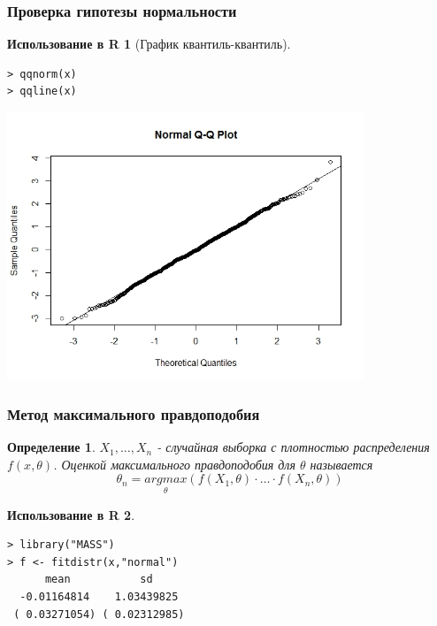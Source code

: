 \documentclass{beamer}
\newtheorem{defn}{Определение}
\newtheorem{exmpr}{Использование в R}
\begin{document}
\begin{frame}[containsverbatim]
\frametitle{Проверка гипотезы нормальности}
\begin{exmpr}[График квантиль-квантиль]
\begin{verbatim}
> qqnorm(x)
> qqline(x)
\end{verbatim}
\begin{center}
\includegraphics[width=0.8\textwidth,height=0.6\textheight]{qqnorm.jpeg}
\end{center}
\end{exmpr}
\end{frame}

\begin{frame}[containsverbatim]
\frametitle{Метод максимального правдоподобия}
\begin{defn}
$X_1,\ldots,X_n$ - случайная выборка с плотностью распределения $f(x,\theta)$. Оценкой максимального правдоподобия для $\theta$ называется 
$$\theta_n=\underset{\theta}{argmax} (f(X_1,\theta)\cdot\ldots\cdot f(X_n,\theta))$$
\end{defn}
\begin{exmpr}
\begin{verbatim}
> library("MASS")
> f <- fitdistr(x,"normal")
      mean           sd     
  -0.01164814    1.03439825 
 ( 0.03271054) ( 0.02312985)
\end{verbatim}
\end{exmpr}
\end{frame}
 
\end{document}
